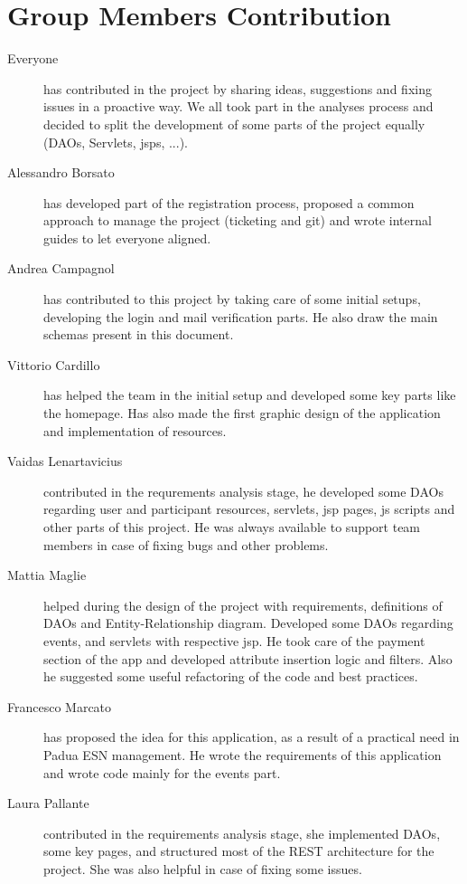 \section{Group Members Contribution}

\begin{description}
    \item[Everyone] has contributed in the project by sharing ideas, suggestions and fixing issues in a proactive way. We all took part in the analyses process and decided to split the development of some parts of the project equally (DAOs, Servlets, jsps, ...).
    \item[Alessandro Borsato] has developed part of the registration process, proposed a common approach to manage the project (ticketing and git) and wrote internal guides to let everyone aligned.
    \item[Andrea Campagnol] has contributed to this project by taking care of some initial setups, developing the login and mail verification parts. He also draw the main schemas present in this document.
    \item[Vittorio Cardillo] has helped the team in the initial setup and developed some key parts like the homepage. Has also made the first graphic design of the application and implementation of resources.
    \item[Vaidas Lenartavicius] contributed in the requrements analysis stage, he developed some DAOs regarding user and participant resources, servlets, jsp pages, js scripts and other parts of this project. He was always available to support team members in case of fixing bugs and other problems.
    \item[Mattia Maglie] helped during the design of the project with requirements, definitions of DAOs and Entity-Relationship diagram. Developed some DAOs regarding events, and servlets with respective jsp. He took care of the payment section of the app and developed attribute insertion logic and filters. Also he suggested some useful refactoring of the code and best practices.
    \item[Francesco Marcato] has proposed the idea for this application, as a result of a practical need in Padua ESN management. He wrote the requirements of this application and wrote code mainly for the events part.
    \item[Laura Pallante] contributed in the requirements analysis stage, she implemented DAOs, some key pages, and structured most of the REST architecture for the project. She was also helpful in case of fixing some issues.

\end{description}
